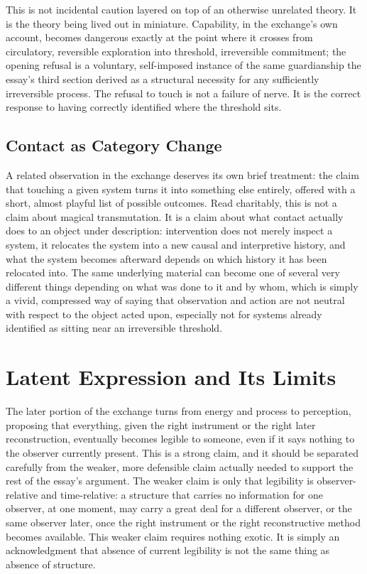 \documentclass[11pt]{article}
\begin{document}
This is not incidental caution layered on top of an otherwise unrelated theory. It is the theory being lived out in miniature. Capability, in the exchange's own account, becomes dangerous exactly at the point where it crosses from circulatory, reversible exploration into threshold, irreversible commitment; the opening refusal is a voluntary, self-imposed instance of the same guardianship the essay's third section derived as a structural necessity for any sufficiently irreversible process. The refusal to touch is not a failure of nerve. It is the correct response to having correctly identified where the threshold sits.

\subsection{Contact as Category Change}

A related observation in the exchange deserves its own brief treatment: the claim that touching a given system turns it into something else entirely, offered with a short, almost playful list of possible outcomes. Read charitably, this is not a claim about magical transmutation. It is a claim about what contact actually does to an object under description: intervention does not merely inspect a system, it relocates the system into a new causal and interpretive history, and what the system becomes afterward depends on which history it has been relocated into. The same underlying material can become one of several very different things depending on what was done to it and by whom, which is simply a vivid, compressed way of saying that observation and action are not neutral with respect to the object acted upon, especially not for systems already identified as sitting near an irreversible threshold.

\section{Latent Expression and Its Limits}

The later portion of the exchange turns from energy and process to perception, proposing that everything, given the right instrument or the right later reconstruction, eventually becomes legible to someone, even if it says nothing to the observer currently present. This is a strong claim, and it should be separated carefully from the weaker, more defensible claim actually needed to support the rest of the essay's argument. The weaker claim is only that legibility is observer-relative and time-relative: a structure that carries no information for one observer, at one moment, may carry a great deal for a different observer, or the same observer later, once the right instrument or the right reconstructive method becomes available. This weaker claim requires nothing exotic. It is simply an acknowledgment that absence of current legibility is not the same thing as absence of structure.
\end{document}

